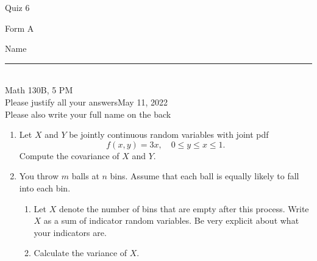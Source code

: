 \documentclass[12pt]{article}
\begin{document}
\begin{flushleft} 
\centerline{\LARGE{Quiz 6}} 
\vspace{5 mm}
{Form A}\hfill  
{Name \rule {2 in}{0.01in}}\\
Math 130B, 5 PM
\\
{Please justify all your answers}\hfill {May 11, 2022}
\\
{Please also write your full name on the back} 

\medskip
\end{flushleft}

\begin{enumerate}




	\item Let $X$ and $Y$ be jointly continuous random variables with joint pdf
	\[
		f(x,y) = 3x,\quad 0\leq y \leq x \leq 1.
	\]
	Compute the covariance of $X$ and $Y$.

	\vfill

	\item You throw $m$ balls at $n$ bins. Assume that each ball is equally likely to fall into each bin.
	\begin{enumerate}
		\item Let $X$ denote the number of bins that are empty after this process. Write $X$ as a sum of indicator random variables. Be very explicit about what your indicators are.
		\vfill

		\item Calculate the variance of $X$.
	\end{enumerate}

	\vfill\null
\end{enumerate}
\pagebreak
\end{document}
